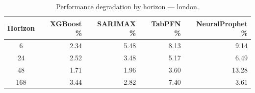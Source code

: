 \begin{table}[h]
\centering
\caption{Performance degradation by horizon — london.}
\label{tab:degradation_horizon_london}
\begin{tabular}{crrrr}
\toprule
Horizon & XGBoost \% & SARIMAX \% & TabPFN \% & NeuralProphet \% \\
\midrule
6 & 2.34 & 5.48 & 8.13 & 9.14 \\
24 & 2.52 & 3.48 & 5.17 & 6.49 \\
48 & 1.71 & 1.96 & 3.60 & 13.28 \\
168 & 3.44 & 2.82 & 7.40 & 3.61 \\
\bottomrule
\end{tabular}
\end{table}
